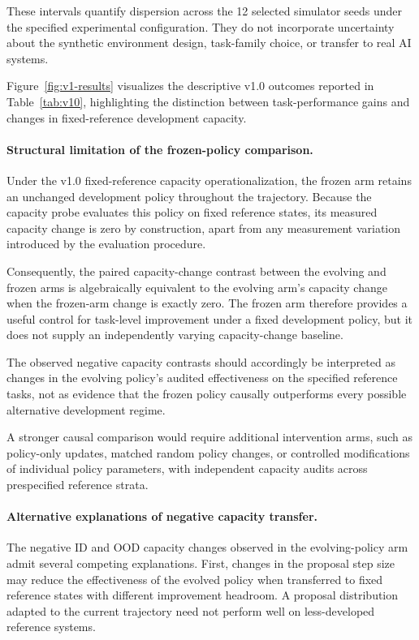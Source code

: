 \documentclass[11pt,a4paper]{article}
\begin{document}
These intervals quantify dispersion across the 12 selected simulator seeds under the specified experimental configuration. They do not incorporate uncertainty about the synthetic environment design, task-family choice, or transfer to real AI systems.

Figure~\ref{fig:v1-results} visualizes the descriptive v1.0 outcomes reported in Table~\ref{tab:v10},
highlighting the distinction between task-performance gains and changes in fixed-reference development capacity.

\paragraph{Structural limitation of the frozen-policy comparison.}

Under the v1.0 fixed-reference capacity operationalization, the frozen arm retains an unchanged development policy throughout the trajectory. Because the capacity probe evaluates this policy on fixed reference states, its measured capacity change is zero by construction, apart from any
measurement variation introduced by the evaluation procedure.

Consequently, the paired capacity-change contrast between the evolving and frozen arms is algebraically equivalent to the evolving arm's capacity change when the frozen-arm change is exactly zero. The frozen arm therefore provides a useful control for task-level improvement under a fixed development policy, but it does not supply an independently varying capacity-change baseline.

The observed negative capacity contrasts should accordingly be interpreted as changes in the evolving policy's audited effectiveness on the specified reference tasks, not as evidence that the frozen
policy causally outperforms every possible alternative development regime.

A stronger causal comparison would require additional intervention arms, such as policy-only updates, matched random policy changes, or controlled modifications of individual policy parameters, with
independent capacity audits across prespecified reference strata.

\paragraph{Alternative explanations of negative capacity transfer.}

The negative ID and OOD capacity changes observed in the evolving-policy arm admit several competing explanations. First, changes in the proposal step size may reduce the effectiveness of the evolved
policy when transferred to fixed reference states with different improvement headroom. A proposal distribution adapted to the current trajectory need not perform well on less-developed reference systems.
\end{document}
